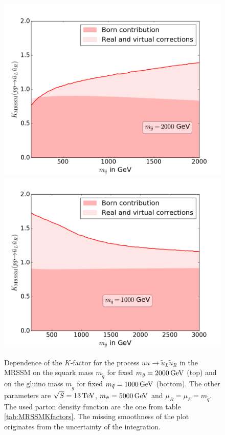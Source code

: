 \begin{figure}[H]
\begin{center}
\includegraphics[scale=.4]{figures/MRSSM_uu_susu_Kfactors_msg=2000GeV.png}
\includegraphics[scale=.4]{figures/MRSSM_uu_susu_Kfactors_msq=1000GeV.png}
\caption{Dependence of the $K$-factor for the process $uu \to \tilde{u}_L\tilde{u}_R$ in the MRSSM on the squark mass $m_{\tilde{q}}$ for fixed $m_{\tilde{g}} = \unit[2000]{GeV}$ (top) and on the gluino mass $m_{\tilde{g}}$ for fixed $m_{\tilde{q}} = \unit[1000]{GeV}$ (bottom). The other parameters are $\sqrt{S} = \unit[13]{TeV}$, $m_{\tilde{\sigma}} = \unit[5000]{GeV}$ and $\mu_R = \mu_F = m_{\tilde{q}}$. The used parton density function are the one from table \ref{tab:MRSSMKfactors}. The missing smoothness of the plot originates from the uncertainty of the integration.}\label{fig:1LXsection_fixed_m_MRSSM}
\end{center}
\end{figure}
